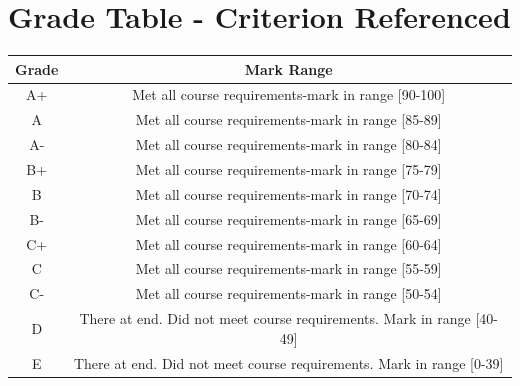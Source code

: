 \documentclass{article}
\begin{document}
\section*{Grade Table - Criterion Referenced}
\renewcommand{\arraystretch}{1.5}
\begin{tabular}{|c|c|}
	\hline
	\textbf{Grade} & \textbf{Mark Range} \\ \hline
	A+             & Met all course requirements-mark in range [90-100]           \\ \hline
	A              & Met all course requirements-mark in range [85-89]              \\ \hline
	A-             & Met all course requirements-mark in range [80-84]             \\ \hline
	B+             & Met all course requirements-mark in range [75-79]             \\ \hline
	B              & Met all course requirements-mark in range [70-74]             \\ \hline
	B-             & Met all course requirements-mark in range [65-69]             \\ \hline
	C+             & Met all course requirements-mark in range [60-64]             \\ \hline
	C              & Met all course requirements-mark in range [55-59]             \\ \hline
	C-             & Met all course requirements-mark in range [50-54]             \\ \hline
	D              & There at end. Did not meet course requirements. Mark in range [40-49]             \\ \hline
	E              & There at end. Did not meet course requirements. Mark in range [0-39]             \\ \hline
\end{tabular}
\end{document}
